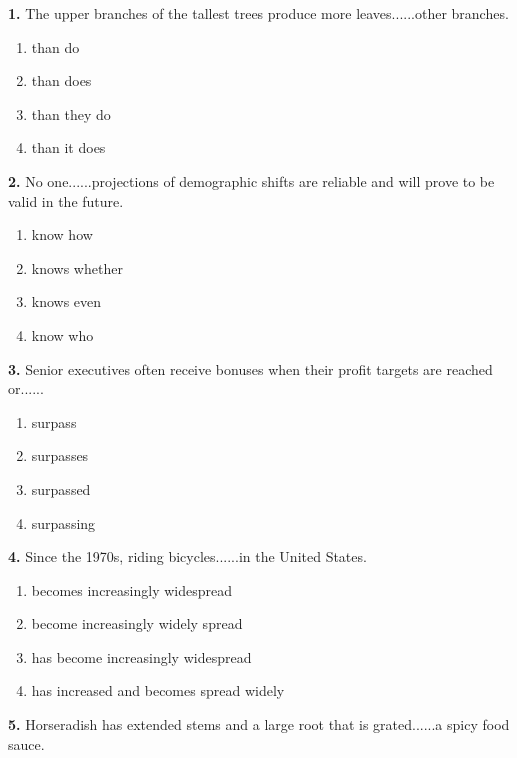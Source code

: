 \documentclass[12pt]{article}
\begin{document}
\noindent\textbf{1.} The upper branches of the tallest trees produce more leaves......other branches.
\begin{enumerate}[label=(\Alph*),leftmargin=*,itemsep=0.2em]
\item than do
\item than does
\item than they do
\item than it does
\end{enumerate}
\par
\vspace{0.25\baselineskip}
\noindent\textbf{2.} No one......projections of demographic shifts are reliable and will prove to be valid in the future.
\begin{enumerate}[label=(\Alph*),leftmargin=*,itemsep=0.2em]
\item know how
\item knows whether
\item knows even
\item know who
\end{enumerate}
\par
\vspace{0.25\baselineskip}
\noindent\textbf{3.} Senior executives often receive bonuses when their profit targets are reached or......
\begin{enumerate}[label=(\Alph*),leftmargin=*,itemsep=0.2em]
\item surpass
\item surpasses
\item surpassed
\item surpassing
\end{enumerate}
\par
\vspace{0.25\baselineskip}
\noindent\textbf{4.} Since the 1970s, riding bicycles......in the United States.
\begin{enumerate}[label=(\Alph*),leftmargin=*,itemsep=0.2em]
\item becomes increasingly widespread
\item become increasingly widely spread
\item has become increasingly widespread
\item has increased and becomes spread widely
\end{enumerate}
\par
\vspace{0.25\baselineskip}
\noindent\textbf{5.} Horseradish has extended stems and a large root that is grated......a spicy food sauce.
\end{document}
